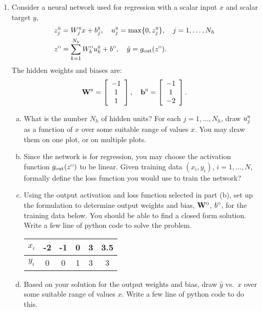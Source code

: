 \documentclass[11pt]{article}
\newcommand{\bbf}{\mathbf{b}}
\newcommand{\Wbf}{\mathbf{W}}
\def\hid{\textsc{\tiny H}}
\def\out{\textsc{\tiny O}}
\begin{document}
\begin{enumerate}
\item Consider a neural network used for regression with a scalar input $x$ and
scalar target $y$,
\begin{align*}
    & z_{j}^\hid = W^\hid_{j}x + b^\hid_j, \quad
    u_{j}^\hid = \max\{0, z^\hid_j\},
    \quad j=1,\ldots,N_h \\
    &
    z^\out = \sum_{k=1}^{N_h} W^\out_{k}u^\hid_{k} + b^\out,
    \quad
    \hat{y} = g_{\rm out}(z^\out).
\end{align*}
The hidden weights and biases are:
\[
    \Wbf^\hid = \left[ \begin{array}{c} -1  \\ 1  \\  1 \end{array} \right], \quad
    \bbf^\hid = \left[ \begin{array}{c} -1 \\ 1 \\ -2 \end{array} \right].
\]

\begin{enumerate}[(a)]

\item What is the number $N_h$ of hidden units?  For each $j=1,\ldots,N_h$,
draw $u^\hid_j$ as a function of $x$ over some suitable range of values $x$. 
You may draw them on one plot, or on
multiple plots.

\item Since the network is for regression, you may choose 
the activation function $g_{\rm out}(z^\out)$ to be linear.
Given training data $(x_i,y_i)$, $i=1,\ldots,N$, formally define the loss function you would use
to train the network?

\item Using the output activation and loss function selected in part (b), set up the formulation to determine 
output weights and bias, $\Wbf^\out$, $b^\out$,
for the training data below.  You should be able to find a closed form solution. Write a few line of python code to solve the problem.
\begin{center}
\begin{tabular}{|c|c|c|c|c|c|} \hline
$x_i$ & -2 & -1 & 0 & 3 & 3.5\\ \hline
$y_i$ & 0 & 0   & 1 & 3 & 3 \\ \hline
\end{tabular}
\end{center}

\item
 Based on your solution for the output weights and bias,  
draw $\hat{y}$ vs.\ $x$ over some suitable range of values $x$.  Write a few line of python code to do this.




\end{enumerate}
\end{enumerate}
\end{document}
